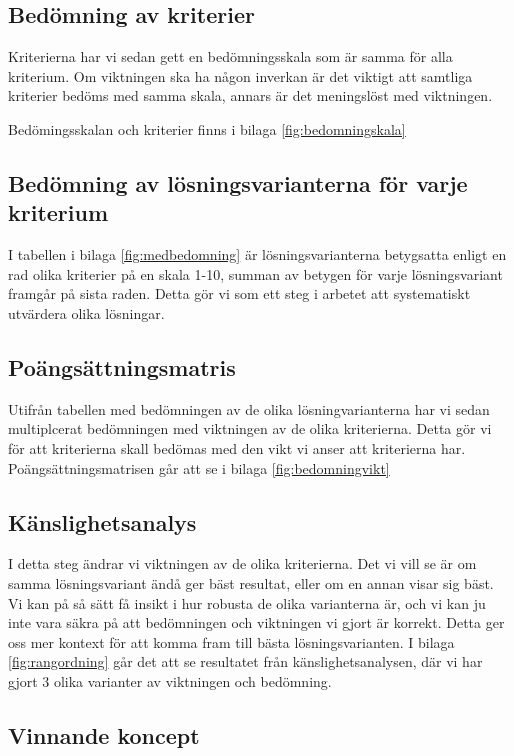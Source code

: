 \documentclass[11pt, a4paper]{report}
\begin{document}
\subsection{Bedömning av kriterier}

Kriterierna har vi sedan gett en bedömningsskala som är samma för alla kriterium. Om viktningen ska ha någon inverkan är det viktigt att samtliga kriterier bedöms med samma skala, annars är det meningslöst med viktningen.

Bedömingsskalan och kriterier finns i bilaga \ref{fig:bedomningskala}

\subsection{Bedömning av lösningsvarianterna för varje kriterium}

I tabellen i bilaga \ref{fig:medbedomning} är lösningsvarianterna betygsatta enligt en rad olika kriterier på en skala 1-10, summan av betygen för varje lösningsvariant framgår på sista raden. Detta gör vi som ett steg i arbetet att systematiskt utvärdera olika lösningar.

\subsection{Poängsättningsmatris}

Utifrån tabellen med bedömningen av de olika lösningvarianterna har vi sedan multiplcerat bedömningen med viktningen av de olika kriterierna. Detta gör vi för att kriterierna skall bedömas med den vikt vi anser att kriterierna har. Poängsättningsmatrisen går att se i bilaga \ref{fig:bedomningvikt}

\subsection{Känslighetsanalys}

I detta steg ändrar vi viktningen av de olika kriterierna. Det vi vill se är om samma lösningsvariant ändå ger bäst resultat, eller om en annan visar sig bäst. Vi kan på så sätt få insikt i hur robusta de olika varianterna är, och vi kan ju inte vara säkra på att bedömningen och viktningen vi gjort är korrekt. Detta ger oss mer kontext för att komma fram till bästa lösningsvarianten. I bilaga \ref{fig:rangordning} går det att se resultatet från känslighetsanalysen, där vi har gjort 3 olika varianter av viktningen och bedömning.

\subsection{Vinnande koncept}
\end{document}
